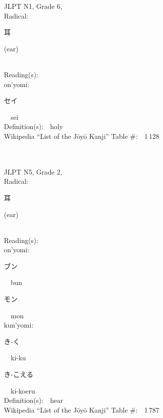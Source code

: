 \begin{multicols}{2}
{JLPT N1, Grade 6, \\Radical:\ \ {\begin{CJK}{UTF8}{min} 耳 \end{CJK}} (ear) } \\
Reading(s):\ \ \\
{\hspace*{1em}}on'yomi:\ \ \\
{\hspace*{2em}}{\begin{CJK}{UTF8}{min} セイ \end{CJK}}\ \ sei\ \ \\
Definition(s):\ \ holy \\
Wikipedia ``List of the J\=oy\=o Kanji'' Table \#:\ \ 1\,128 \\
\ \ \\
{\fontsize{34pt}{40pt}  }\ \ \\  %
{JLPT N5, Grade 2, \\Radical:\ \ {\begin{CJK}{UTF8}{min} 耳 \end{CJK}} (ear) } \\
Reading(s):\ \ \\
{\hspace*{1em}}on'yomi:\ \ \\
{\hspace*{2em}}{\begin{CJK}{UTF8}{min} ブン \end{CJK}}\ \ bun\ \ \\
{\hspace*{2em}}{\begin{CJK}{UTF8}{min} モン \end{CJK}}\ \ mon\ \ \\
{\hspace*{1em}}kun'yomi:\ \ \\
{\hspace*{2em}}{\begin{CJK}{UTF8}{min} き-く \end{CJK}}\ \ ki-ku\ \ \\
{\hspace*{2em}}{\begin{CJK}{UTF8}{min} き-こえる \end{CJK}}\ \ ki-koeru\ \ \\
Definition(s):\ \ hear \\
Wikipedia ``List of the J\=oy\=o Kanji'' Table \#:\ \ 1\,787 \\
\ \ \\
\end{multicols}


